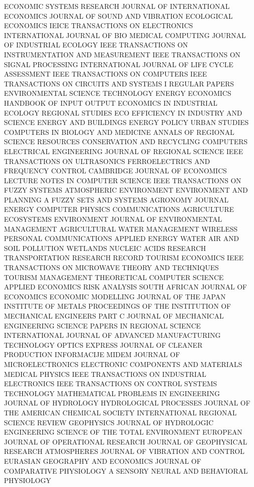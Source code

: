ECONOMIC SYSTEMS RESEARCH			JOURNAL OF INTERNATIONAL ECONOMICS			JOURNAL OF SOUND AND VIBRATION
	ECOLOGICAL ECONOMICS			IEICE TRANSACTIONS ON ELECTRONICS			INTERNATIONAL JOURNAL OF BIO MEDICAL COMPUTING
	JOURNAL OF INDUSTRIAL ECOLOGY			IEEE TRANSACTIONS ON INSTRUMENTATION AND MEASUREMENT			IEEE TRANSACTIONS ON SIGNAL PROCESSING
	INTERNATIONAL JOURNAL OF LIFE CYCLE ASSESSMENT			IEEE TRANSACTIONS ON COMPUTERS			IEEE TRANSACTIONS ON CIRCUITS AND SYSTEMS I REGULAR PAPERS
	ENVIRONMENTAL SCIENCE TECHNOLOGY			ENERGY ECONOMICS			HANDBOOK OF INPUT OUTPUT ECONOMICS IN INDUSTRIAL ECOLOGY
	REGIONAL STUDIES			ECO EFFICIENCY IN INDUSTRY AND SCIENCE			ENERGY AND BUILDINGS
	ENERGY POLICY			URBAN STUDIES			COMPUTERS IN BIOLOGY AND MEDICINE
	ANNALS OF REGIONAL SCIENCE			RESOURCES CONSERVATION AND RECYCLING			COMPUTERS ELECTRICAL ENGINEERING
	JOURNAL OF REGIONAL SCIENCE			IEEE TRANSACTIONS ON ULTRASONICS FERROELECTRICS AND FREQUENCY CONTROL			CAMBRIDGE JOURNAL OF ECONOMICS
	LECTURE NOTES IN COMPUTER SCIENCE			IEEE TRANSACTIONS ON FUZZY SYSTEMS			ATMOSPHERIC ENVIRONMENT
	ENVIRONMENT AND PLANNING A			FUZZY SETS AND SYSTEMS			AGRONOMY JOURNAL
	ENERGY			COMPUTER PHYSICS COMMUNICATIONS			AGRICULTURE ECOSYSTEMS ENVIRONMENT
	JOURNAL OF ENVIRONMENTAL MANAGEMENT			AGRICULTURAL WATER MANAGEMENT			WIRELESS PERSONAL COMMUNICATIONS
	APPLIED ENERGY			WATER AIR AND SOIL POLLUTION			WETLANDS
	NUCLEIC ACIDS RESEARCH			TRANSPORTATION RESEARCH RECORD			TOURISM ECONOMICS
	IEEE TRANSACTIONS ON MICROWAVE THEORY AND TECHNIQUES			TOURISM MANAGEMENT			THEORETICAL COMPUTER SCIENCE
	APPLIED ECONOMICS			RISK ANALYSIS			SOUTH AFRICAN JOURNAL OF ECONOMICS
	ECONOMIC MODELLING			JOURNAL OF THE JAPAN INSTITUTE OF METALS			PROCEEDINGS OF THE INSTITUTION OF MECHANICAL ENGINEERS PART C JOURNAL OF MECHANICAL ENGINEERING SCIENCE
	PAPERS IN REGIONAL SCIENCE			INTERNATIONAL JOURNAL OF ADVANCED MANUFACTURING TECHNOLOGY			OPTICS EXPRESS
	JOURNAL OF CLEANER PRODUCTION			INFORMACIJE MIDEM JOURNAL OF MICROELECTRONICS ELECTRONIC COMPONENTS AND MATERIALS			MEDICAL PHYSICS
	IEEE TRANSACTIONS ON INDUSTRIAL ELECTRONICS			IEEE TRANSACTIONS ON CONTROL SYSTEMS TECHNOLOGY			MATHEMATICAL PROBLEMS IN ENGINEERING
	JOURNAL OF HYDROLOGY			HYDROLOGICAL PROCESSES			JOURNAL OF THE AMERICAN CHEMICAL SOCIETY
	INTERNATIONAL REGIONAL SCIENCE REVIEW			GEOPHYSICS			JOURNAL OF HYDROLOGIC ENGINEERING
	SCIENCE OF THE TOTAL ENVIRONMENT			EUROPEAN JOURNAL OF OPERATIONAL RESEARCH			JOURNAL OF GEOPHYSICAL RESEARCH ATMOSPHERES
	JOURNAL OF VIBRATION AND CONTROL			EURASIAN GEOGRAPHY AND ECONOMICS			JOURNAL OF COMPARATIVE PHYSIOLOGY A SENSORY NEURAL AND BEHAVIORAL PHYSIOLOGY
